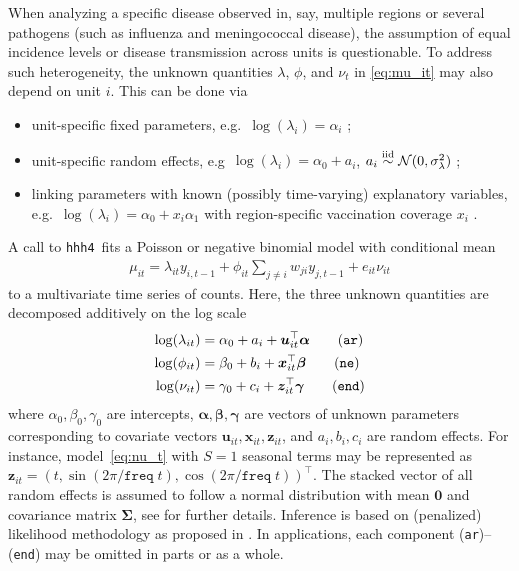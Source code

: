 \documentclass[a4paper,11pt]{article}
\newcommand{\n}{{\cal N}}
\newcommand{\code}[1]{\texttt{#1}}
\newcommand{\hhh}{\texttt{hhh4}}
\begin{document}
When analyzing a specific disease observed in, say, multiple regions or several
pathogens (such as influenza and meningococcal disease), the assumption
of equal incidence levels or disease transmission across units is
questionable. To address such heterogeneity, the unknown quantities
$\lambda$, $\phi$, and $\nu_t$ in \eqref{eq:mu_it} may also depend on unit
$i$. This can be done via
\begin{itemize}
  \item unit-specific fixed parameters, e.g.\ $\log(\lambda_i)=\alpha_i$ 
     \citep{paul-etal-2008};
  \item unit-specific random effects, e.g\ $\log(\lambda_i)=\alpha_0 +a_i$, 
     $a_i \stackrel{\text{iid}}{\sim} \n(0,\sigma^2_\lambda)$ \citep{paul-held-2011};
  \item linking parameters with known (possibly time-varying) explanatory 
     variables, e.g.\ $\log(\lambda_i)=\alpha_0 +x_i\alpha_1$ with
     region-specific vaccination coverage $x_i$ \citep{herzog-etal-2010}.
\end{itemize}

A call to \hhh\ fits a Poisson or negative binomial model with conditional
mean
\begin{align*}
  \mu_{it} = \lambda_{it} y_{i,t-1} + \phi_{it} \sum_{j\neq i} w_{ji} y_{j,t-1} +e_{it} \nu_{it}
\end{align*}
to a multivariate time series of counts.
Here, the three unknown quantities are decomposed additively on the log scale
\begin{align}
  \log(\lambda_{it}) &= \alpha_0 + a_i +\bm{u}_{it}^\top \bm{\alpha} \tag{\code{ar}}\\
  \log(\phi_{it}) &=  \beta_0 + b_i +\bm{x}_{it}^\top \bm{\beta} \tag{\code{ne}}\\
  \log(\nu_{it}) &=  \gamma_0 + c_i +\bm{z}_{it}^\top \bm{\gamma}\tag{\code{end}}
\end{align}
where $\alpha_0,\beta_0,\gamma_0$ are intercepts, $\bm{\alpha},\bm{\beta},\bm{\gamma}$
are vectors of unknown parameters corresponding to covariate vectors 
$\bm{u}_{it},\bm{x}_{it},\bm{z}_{it}$, and $a_i,b_i,c_i$ are random effects. 
For instance, model~\eqref{eq:nu_t} with $S=1$ seasonal terms may be
represented as $\bm{z}_{it}=(t,\sin(2\pi/\code{freq}\;t),\cos(2\pi/\code{freq}\;t))^\top$.
The stacked vector of all random effects
is assumed to follow a normal distribution with mean $\bm{0}$ and covariance
matrix $\bm{\Sigma}$, see \cite{paul-held-2011} for further details.
Inference is based on (penalized) likelihood methodology as proposed in 
\cite{paul-held-2011}. In applications, each component (\code{ar})--(\code{end}) 
may be omitted in parts or as a whole.
\end{document}
